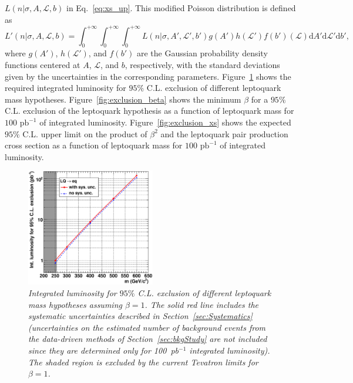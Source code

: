 $L(n|\sigma,A,\mathcal{L},b)$ in Eq.~\ref{eq:xs_up}. This modified Poisson distribution is defined as
\begin{equation}
L'(n|\sigma,A,\mathcal{L},b)=\int_0^{+\infty}\int_0^{+\infty}\int_0^{+\infty} L(n|\sigma,A',\mathcal{L}',b')g(A')h(\mathcal{L}')f(b')(\mathcal{L})\mathrm{d}A'\mathrm{d}\mathcal{L}'\mathrm{d}b',
\end{equation}
where $g(A')$, $h(\mathcal{L}')$, and $f(b')$ are the Gaussian probability density functions centered at $A$, $\mathcal{L}$, and $b$, respectively,
with the standard deviations given by the uncertainties in the corresponding parameters. Figure~\ref{fig:exclusion}
shows the required integrated luminosity for $95\%$ C.L. exclusion of different leptoquark mass hypotheses. 
Figure~\ref{fig:exclusion_beta} shows the minimum $\beta$ for a $95\%$ C.L. exclusion of the leptoquark hypothesis 
as a function of leptoquark mass for $100\text{ pb}^{-1}$ of integrated luminosity.
Figure~\ref{fig:exclusion_xs}
shows the expected $95\%$ C.L. upper limit on the product of $\beta^2$ and the leptoquark pair production cross section as a function
of leptoquark mass for $100\text{ pb}^{-1}$ of integrated luminosity.

\begin{figure}[h!]
 \centering
  \includegraphics[width=0.5\textwidth]{plots/cmsPotential/L95CL_vs_m_log.eps}
 \caption{\small \sl Integrated luminosity
for $95\%$ C.L. exclusion of different leptoquark mass hypotheses assuming $\beta=1$. 
The solid red line includes the systematic uncertainties described in Section~\ref{sec:Systematics}
(uncertainties on the estimated number of background events from the data-driven methods
of Section~\ref{sec:bkgStudy} are not included since they are determined only for 100~pb$^{-1}$ integrated luminosity). 
The shaded region is excluded by the current Tevatron limits for $\beta=1$.\label{fig:exclusion}}
\end{figure}

